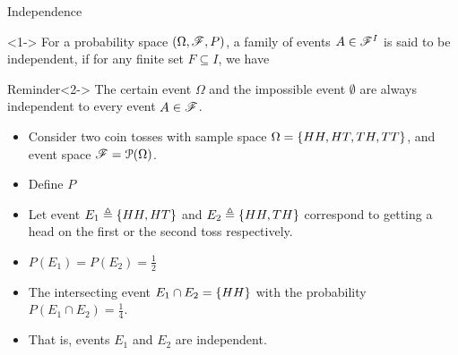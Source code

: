 \documentclass[12pt,aspectratio=169]{beamer}
\begin{document}
\begin{frame}{Independence}
\begin{Definition}<1->
For a probability space $(\Omega, \mathscr{F}, P)$, a family of events $A \in \mathscr{F}^I$ is said to be independent, 
if for any finite set $F \subseteq I$, we have 
\end{Definition}
\begin{block}{Reminder}<2->
The certain event $\Omega$ and the impossible event $\emptyset$ are always independent to every event $A \in \mathscr{F}$. 
\end{block}
\end{frame}
\begin{frame}


\begin{Example} 
\begin{itemize}
\item <1-> Consider two coin tosses with sample space $\Omega = \left\{HH, HT, TH, TT\right\}$, and event space $\mathscr{F} = \mathcal{P}(\Omega)$. 
\item <2-> Define $P$
\item <2-> Let event $E_1 \triangleq \left\{HH, HT\right\}$ and $E_2 \triangleq \left\{HH, TH\right\}$ correspond to getting a head on the first or the second toss respectively. 
\item <3-> $P(E_1) = P(E_2) = \frac{1}{2}$ 
\item <4-> The intersecting event $E_1\cap E_2 = \left\{HH\right\}$ with the probability $P(E_1 \cap E_2) = \frac{1}{4}$. 
\item <5-> 
That is, events $E_1$ and $E_2$ are independent. 
\end{itemize}
\end{Example}
\end{frame}
\end{document}
